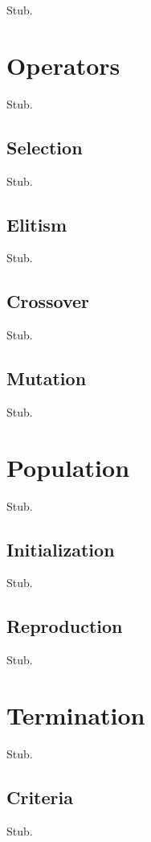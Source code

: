 Stub.

\section{Operators}

Stub.

\subsection{Selection}

Stub.

\subsection{Elitism}

Stub.

\subsection{Crossover}

Stub.

\subsection{Mutation}

Stub.

\section{Population}

Stub.

\subsection{Initialization}

Stub.

\subsection{Reproduction}

Stub.

\section{Termination}

Stub.

\subsection{Criteria}

Stub.
